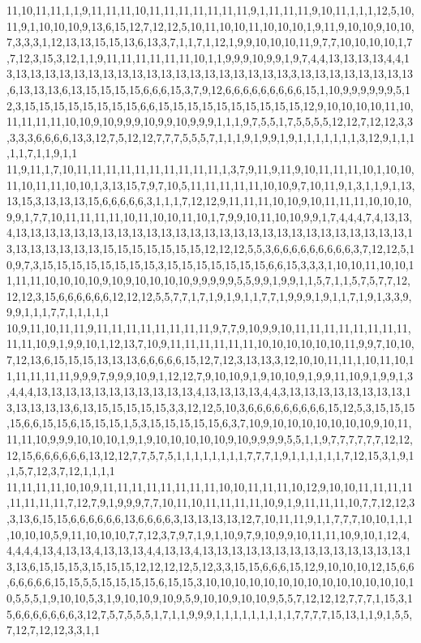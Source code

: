 11,10,11,11,1,1,9,11,11,11,10,11,11,11,11,11,11,11,9,1,11,11,11,9,10,11,1,1,1,12,5,10,11,9,1,10,10,10,9,13,6,15,12,7,12,12,5,10,11,10,10,11,10,10,10,1,9,11,9,10,10,9,10,10,7,3,3,3,1,12,13,13,15,15,13,6,13,3,7,1,1,7,1,12,1,9,9,10,10,10,11,9,7,7,10,10,10,10,1,7,7,12,3,15,3,12,1,1,9,11,11,11,11,11,11,10,1,1,9,9,9,10,9,9,1,9,7,4,4,13,13,13,13,4,4,13,13,13,13,13,13,13,13,13,13,13,13,13,13,13,13,13,13,13,13,3,13,13,13,13,13,13,13,13,6,13,13,13,6,13,15,15,15,15,6,6,6,15,3,7,9,12,6,6,6,6,6,6,6,6,6,15,1,10,9,9,9,9,9,9,5,12,3,15,15,15,15,15,15,15,15,6,6,15,15,15,15,15,15,15,15,15,15,12,9,10,10,10,10,11,10,11,11,11,11,10,10,9,10,9,9,9,10,9,9,10,9,9,9,1,1,1,9,7,5,5,1,7,5,5,5,5,12,12,7,12,12,3,3,3,3,3,6,6,6,6,13,3,12,7,5,12,12,7,7,7,5,5,5,7,1,1,1,9,1,9,9,1,9,1,1,1,1,1,1,1,3,12,9,1,1,1,1,1,7,1,1,9,1,1
11,9,11,1,7,10,11,11,11,11,11,11,11,11,11,11,1,3,7,9,11,9,11,9,10,11,11,11,10,1,10,10,11,10,11,11,10,10,1,3,13,15,7,9,7,10,5,11,11,11,11,11,10,10,9,7,10,11,9,1,3,1,1,9,1,13,13,15,3,13,13,13,15,6,6,6,6,6,3,1,1,1,7,12,12,9,11,11,11,10,10,9,10,11,11,11,10,10,10,9,9,1,7,7,10,11,11,11,11,10,11,10,10,11,10,1,7,9,9,10,11,10,10,9,9,1,7,4,4,4,7,4,13,13,4,13,13,13,13,13,13,13,13,13,13,13,13,13,13,13,13,13,13,13,13,13,13,13,13,13,13,13,13,13,13,13,13,13,13,15,15,15,15,15,15,15,12,12,12,5,5,3,6,6,6,6,6,6,6,6,6,3,7,12,12,5,10,9,7,3,15,15,15,15,15,15,15,15,3,15,15,15,15,15,15,15,6,6,15,3,3,3,1,10,10,11,10,10,11,11,11,10,10,10,10,9,10,9,10,10,10,10,9,9,9,9,9,5,5,9,9,1,9,9,1,1,5,7,1,1,5,7,5,7,7,12,12,12,3,15,6,6,6,6,6,6,12,12,12,5,5,7,7,1,7,1,9,1,9,1,1,7,7,1,9,9,9,1,9,1,1,7,1,9,1,3,3,9,9,9,1,1,1,7,7,1,1,1,1,1
10,9,11,10,11,11,9,11,11,11,11,11,11,11,11,9,7,7,9,10,9,9,10,11,11,11,11,11,11,11,11,11,11,10,9,1,9,9,10,1,12,13,7,10,9,11,11,11,11,11,11,10,10,10,10,10,10,11,9,9,7,10,10,7,12,13,6,15,15,15,13,13,13,6,6,6,6,6,15,12,7,12,3,13,13,3,12,10,10,11,11,1,10,11,10,11,11,11,11,11,9,9,9,7,9,9,9,10,9,1,12,12,7,9,10,10,9,1,9,10,10,9,1,9,9,11,10,9,1,9,9,1,3,4,4,4,13,13,13,13,13,13,13,13,13,13,13,4,13,13,13,13,4,4,3,13,13,13,13,13,13,13,13,13,13,13,13,13,6,13,15,15,15,15,15,3,3,12,12,5,10,3,6,6,6,6,6,6,6,6,6,15,12,5,3,15,15,15,15,6,6,15,15,6,15,15,15,1,5,3,15,15,15,15,15,6,3,7,10,9,10,10,10,10,10,10,10,9,10,11,11,11,10,9,9,9,10,10,10,1,9,1,9,10,10,10,10,10,9,10,9,9,9,9,5,5,1,1,9,7,7,7,7,7,7,12,12,12,15,6,6,6,6,6,6,13,12,12,7,7,5,7,5,1,1,1,1,1,1,1,1,7,7,7,1,9,1,1,1,1,1,1,7,12,15,3,1,9,1,1,5,7,12,3,7,12,1,1,1,1
11,11,11,11,10,10,9,11,11,11,11,11,11,11,11,10,10,11,11,11,10,12,9,10,10,11,11,11,11,11,11,11,11,7,12,7,9,1,9,9,9,7,7,10,11,10,11,11,11,11,10,9,1,9,11,11,11,10,7,7,12,12,3,3,13,6,15,15,6,6,6,6,6,6,13,6,6,6,6,3,13,13,13,13,12,7,10,11,11,9,1,1,7,7,7,10,10,1,1,1,10,10,10,5,9,11,10,10,10,7,7,12,3,7,9,7,1,9,1,10,9,7,9,10,9,9,10,11,11,10,9,10,1,12,4,4,4,4,4,13,4,13,13,4,13,13,13,4,4,13,13,4,13,13,13,13,13,13,13,13,13,13,13,13,13,13,13,13,6,15,15,15,3,15,15,15,12,12,12,12,5,12,3,3,15,15,6,6,6,15,12,9,10,10,10,12,15,6,6,6,6,6,6,6,15,15,5,5,15,15,15,15,6,15,15,3,10,10,10,10,10,10,10,10,10,10,10,10,10,10,10,5,5,5,1,9,10,10,5,3,1,9,10,10,9,10,9,5,9,10,10,9,10,10,9,5,5,7,12,12,12,7,7,7,1,15,3,15,6,6,6,6,6,6,6,3,12,7,5,7,5,5,5,1,7,1,1,9,9,9,1,1,1,1,1,1,1,1,1,7,7,7,7,15,13,1,1,9,1,5,5,7,12,7,12,12,3,3,1,1
